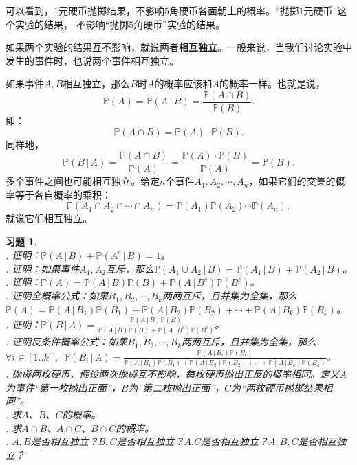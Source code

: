\documentclass[12pt,UTF8]{ctexbook}
\newtheorem{xt}{习题}[section]
\begin{document}
可以看到，$1$元硬币抛掷结果，不影响$5$角硬币各面朝上的概率。“抛掷$1$元硬币”这个实验的结果，
不影响“抛掷$5$角硬币”实验的结果。

如果两个实验的结果互不影响，就说两者\textbf{相互独立}。一般来说，当我们讨论实验中发生的事件时，也说两个事件相互独立。

如果事件$A,B$相互独立，那么$B$时$A$的概率应该和$A$的概率一样。也就是说，
$$\mathbb{P}(A) = \mathbb{P}(A \, | \, B) = \frac{\mathbb{P}(A \cap B)}{\mathbb{P}(B)}.$$
即：
$$\mathbb{P}(A \cap B) = \mathbb{P}(A) \cdot \mathbb{P}(B).$$
同样地，
$$\mathbb{P}(B \, | \, A) = \frac{\mathbb{P}(A \cap B)}{\mathbb{P}(A)} = \frac{\mathbb{P}(A) \cdot \mathbb{P}(B)}{\mathbb{P}(A)} = \mathbb{P}(B).$$
多个事件之间也可能相互独立。给定$n$个事件$A_1, A_2, \cdots, A_n$，如果它们的交集的概率等于各自概率的乘积：
$$\mathbb{P}(A_1\cap A_2\cap \cdots \cap A_n) = \mathbb{P}(A_1) \mathbb{P}(A_2) \cdots \mathbb{P}(A_n),$$
就说它们相互独立。

\begin{xt}
    \mbox{} \\
    . 证明：$\mathbb{P}(A \, | \, B) + \mathbb{P}(A^c \, | \, B) = 1$。 \\
    . 证明：如果事件$A_1,A_2$互斥，那么$\mathbb{P}(A_1 \cup A_2\, | \, B) = \mathbb{P}(A_1 \, | \, B) + \mathbb{P}(A_2 \, | \, B)$。 \\
    . 证明：$\mathbb{P}(A) = \mathbb{P}(A \, | \, B) \mathbb{P}(B) + \mathbb{P}(A \, | \, B^c) \mathbb{P}(B^c)$。 \\
    . 证明全概率公式：如果$B_1, B_2, \cdots, B_k$两两互斥，且并集为全集，那么$\mathbb{P}(A) = \mathbb{P}(A \, | \, B_1) \mathbb{P}(B_1) + \mathbb{P}(A \, | \, B_2) \mathbb{P}(B_2) + \cdots + \mathbb{P}(A \, | \, B_k) \mathbb{P}(B_k)$。 \\
    . 证明：$\mathbb{P}(B \, | \, A) = \frac{\mathbb{P}(A \, | \, B) \mathbb{P}(B)}{\mathbb{P}(A \, | \, B) \mathbb{P}(B) + \mathbb{P}(A \, | \, B^c) \mathbb{P}(B^c)}$。 \\
    . 证明反条件概率公式：如果$B_1, B_2, \cdots, B_k$两两互斥，且并集为全集，那么$\forall i\in[1..k], \,\,\, \mathbb{P}(B_i \, | \, A) = \frac{\mathbb{P}(A \, | \, B_i) \mathbb{P}(B_i)}{\mathbb{P}(A \, | \, B_1) \mathbb{P}(B_1) + \mathbb{P}(A \, | \, B_2) \mathbb{P}(B_2) + \cdots + \mathbb{P}(A \, | \, B_k) \mathbb{P}(B_k)}$。 \\
    . 抛掷两枚硬币，假设两次抛掷互不影响，每枚硬币抛出正反的概率相同。定义$A$为事件“第一枚抛出正面”，$B$为“第二枚抛出正面”，$C$为“两枚硬币抛掷结果相同”。 \\
    . 求$A$、$B$、$C$的概率。\\
    . 求$A\cap B$、$A\cap C$、$B \cap C$的概率。\\
    . $A,B$是否相互独立？$B,C$是否相互独立？$A.C$是否相互独立？$A,B,C$是否相互独立？
\end{xt}
\end{document}

